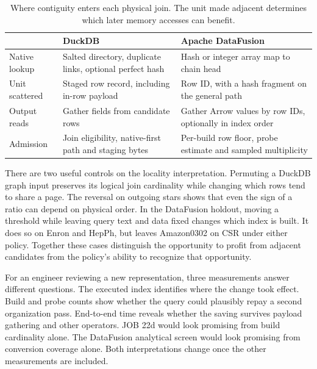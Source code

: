 \documentclass[11pt,a4paper]{article}
\begin{document}
\begin{table}[htbp]
\caption{Where contiguity enters each physical join. The unit made adjacent determines which later
memory accesses can benefit.}\label{tab:architecture}
\centering\small
\begin{tabularx}{\linewidth}{@{}lXX@{}}
\toprule & DuckDB & Apache DataFusion\\ \midrule
Native lookup & Salted directory, duplicate links, optional perfect hash & Hash or integer array map to chain head\\
Unit scattered & Staged row record, including in-row payload & Row ID, with a hash fragment on the general path\\
Output reads & Gather fields from candidate rows & Gather Arrow values by row IDs, optionally in index order\\
Admission & Join eligibility, native-first path and staging bytes & Per-build row floor, probe estimate and sampled multiplicity\\
\bottomrule
\end{tabularx}
\end{table}

There are two useful controls on the locality interpretation. Permuting a DuckDB graph input
preserves its logical join cardinality while changing which rows tend to share a page. The
reversal on outgoing stars shows that even the sign of a ratio can depend on physical order. In
the DataFusion holdout, moving a threshold while leaving query text and data fixed changes which
index is built. It does so on Enron and HepPh, but leaves Amazon0302 on CSR under either policy.
Together these cases distinguish the opportunity to profit from adjacent candidates from the
policy's ability to recognize that opportunity.

For an engineer reviewing a new representation, three measurements answer different questions. The
executed index identifies where the change took effect. Build and probe counts show whether the
query could plausibly repay a second organization pass. End-to-end time reveals whether the saving
survives payload gathering and other operators. JOB 22d would look promising from build
cardinality alone. The DataFusion analytical screen would look promising from conversion coverage
alone. Both interpretations change once the other measurements are included.
\end{document}
